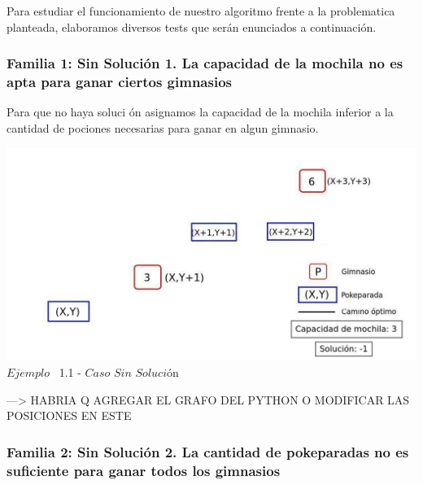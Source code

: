 \indent Para estudiar el funcionamiento de nuestro algoritmo frente a la problematica planteada, elaboramos diversos tests que ser\'an enunciados a continuaci\'on.\\

\begin{center}
 \subsubsection*{Familia 1: Sin Soluci\'on 1. La capacidad de la mochila no es apta para ganar ciertos gimnasios}
\end{center}

Para que no haya soluci \'on asignamos la capacidad de la mochila inferior a la cantidad de pociones necesarias para ganar en algun gimnasio.\\
 
\vspace*{0.3cm} \vspace*{0.3cm}
  \begin{center}
 \includegraphics[scale=0.60]{./EJ1/sinSolucion.jpeg}
\\{$Ejemplo$ \ 1.1 - $Caso$ $Sin$ $Soluci$\'on}
  \end{center}
  \vspace*{0.3cm}

---> HABRIA Q AGREGAR EL GRAFO DEL PYTHON O MODIFICAR LAS POSICIONES EN ESTE\\

\begin{center}
 \subsubsection*{Familia 2: Sin Soluci\'on 2. La cantidad de pokeparadas no es suficiente para ganar todos los gimnasios}
\end{center}

